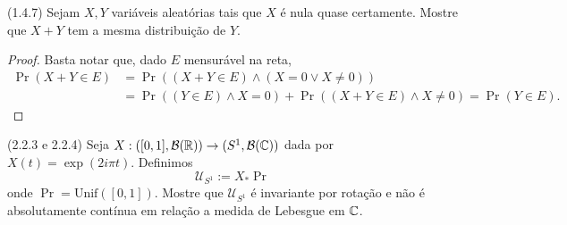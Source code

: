 \begin{exercise}
	(1.4.7)
	Sejam $X,Y$ variáveis aleatórias tais que $X$ é nula quase
	certamente. Mostre que $X+Y$ tem a mesma distribuição de $Y$.
\end{exercise}
\begin{proof}
	Basta notar que, dado $E$ mensurável na reta,
	\begin{align*}
		\Pr(X + Y \in E) &= \Pr((X + Y \in E) \land (X = 0 \lor X \neq 0))\\
		&= \Pr((Y \in E) \land X = 0) + \Pr((X + Y \in E) \land X \neq 0) =
		\Pr(Y \in E).
	\end{align*}
\end{proof}

\begin{exercise}
	(2.2.3 e 2.2.4)
	Seja $X : ([0,1], \mathcal{B}(\mathbb{R})) \rightarrow (S^1,\mathcal{B}(\mathbb{C}))$ dada
	por $X(t) = \exp(2i\pi t)$. Definimos
	\[
		\mathcal{U}_{S^1} := X_*\Pr
	\]
	onde $\Pr = \text{Unif}([0,1])$. Mostre que $\mathcal{U}_{S^1}$ é
	invariante por
	rotação e não é absolutamente contínua em relação a medida
	de Lebesgue em $\mathbb{C}$.
\end{exercise}

